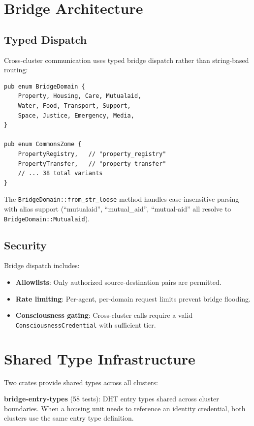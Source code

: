 \documentclass[11pt,twocolumn]{article}
\begin{document}
\section{Bridge Architecture}

\subsection{Typed Dispatch}

Cross-cluster communication uses typed bridge dispatch rather than string-based
routing:

\begin{lstlisting}
pub enum BridgeDomain {
    Property, Housing, Care, Mutualaid,
    Water, Food, Transport, Support,
    Space, Justice, Emergency, Media,
}

pub enum CommonsZome {
    PropertyRegistry,   // "property_registry"
    PropertyTransfer,   // "property_transfer"
    // ... 38 total variants
}
\end{lstlisting}

The \texttt{BridgeDomain::from\_str\_loose} method handles case-insensitive
parsing with alias support (``mutualaid'', ``mutual\_aid'', ``mutual-aid''
all resolve to \texttt{BridgeDomain::Mutualaid}).

\subsection{Security}

Bridge dispatch includes:

\begin{itemize}[nosep]
  \item \textbf{Allowlists}: Only authorized source-destination pairs are
    permitted.
  \item \textbf{Rate limiting}: Per-agent, per-domain request limits prevent
    bridge flooding.
  \item \textbf{Consciousness gating}: Cross-cluster calls require a valid
    \texttt{ConsciousnessCredential} with sufficient tier.
\end{itemize}

\section{Shared Type Infrastructure}

Two crates provide shared types across all clusters:

\textbf{bridge-entry-types} (58 tests): DHT entry types shared across cluster
boundaries. When a housing unit needs to reference an identity credential,
both clusters use the same entry type definition.
\end{document}
